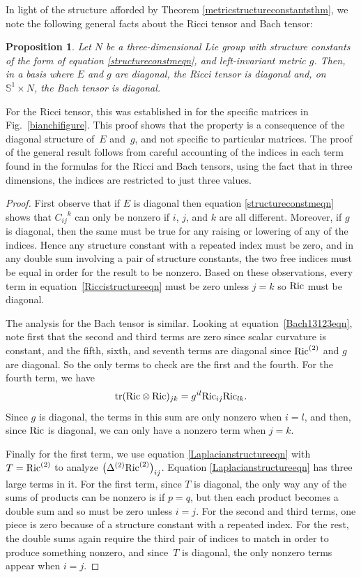 \documentclass[pdftex]{sigma}
\numberwithin{equation}{section}
\newtheorem{Proposition}[Theorem]{Proposition}
 { \theoremstyle{definition}
\newtheorem{Definition}[Theorem]{Definition}
\newtheorem{Example}[Theorem]{Example}
\newtheorem{Remark}[Theorem]{Remark} }
\newcommand{\tr}{\operatorname{tr}} %
\begin{document}
In light of the structure afforded by Theorem \ref{metricstructureconstantsthm}, we note the following general facts about the Ricci tensor and Bach tensor:

\begin{Proposition} \label{RicBachdiagprop}
Let $N$ be a three-dimensional Lie group with structure constants of the form of equation \eqref{structureconstmeqn}, and left-invariant metric $g$. Then, in a basis where $E$ and $g$ are diagonal, the Ricci tensor is diagonal and, on $\mathbb{S}^1 \times N$, the Bach tensor is diagonal.
\end{Proposition}

For the Ricci tensor, this was established in \cite{IJ} for the specific matrices in Fig.~\ref{bianchifigure}. This proof shows that the property is a consequence of the diagonal structure of~$E$ and~$g$, and not specific to particular matrices. The proof of the general result follows from careful accounting of the indices in each term found in the formulas for the Ricci and Bach tensors, using the fact that in three dimensions, the indices are restricted to just three values.

\begin{proof}First observe that if $E$ is diagonal then equation \eqref{structureconstmeqn} shows that ${C_{ij}}^k$ can only be nonzero if $i$, $j$, and $k$ are all different. Moreover, if $g$ is diagonal, then the same must be true for any raising or lowering of any of the indices. Hence any structure constant with a repeated index must be zero, and in any double sum involving a pair of structure constants, the two free indices must be equal in order for the result to be nonzero. Based on these observations, every term in equation~\eqref{Riccistructureeqn} must be zero unless $j = k$ so ${\rm Ric}$ must be diagonal.

The analysis for the Bach tensor is similar. Looking at equation~\eqref{Bach13123eqn}, note first that the second and third terms are zero since scalar curvature is constant, and the fifth, sixth, and seventh terms are diagonal since ${\rm Ric}^{(2)}$ and $g$ are diagonal. So the only terms to check are the first and the fourth. For the fourth term, we have
\[
\tr({\rm Ric} \otimes {\rm Ric})_{jk} = g^{il} {\rm Ric}_{ij} {\rm Ric}_{lk}.
\]
Since $g$ is diagonal, the terms in this sum are only nonzero when $i = l$, and then, since ${\rm Ric}$ is diagonal, we can only have a nonzero term when $j = k$.

Finally for the first term, we use equation \eqref{Laplacianstructureeqn} with $T = {\rm Ric}^{(2)}$ to analyze $\big(\Delta^{(2)} {\rm Ric}^{(2)}\big)_{ij}$. Equation \eqref{Laplacianstructureeqn} has three large terms in it. For the first term, since $T$ is diagonal, the only way any of the sums of products can be nonzero is if $p = q$, but then each product becomes a double sum and so must be zero unless $i = j$. For the second and third terms, one piece is zero because of a structure constant with a repeated index. For the rest, the double sums again require the third pair of indices to match in order to produce something nonzero, and since~$T$ is diagonal, the only nonzero terms appear when $i = j$.
\end{proof}
\end{document}
